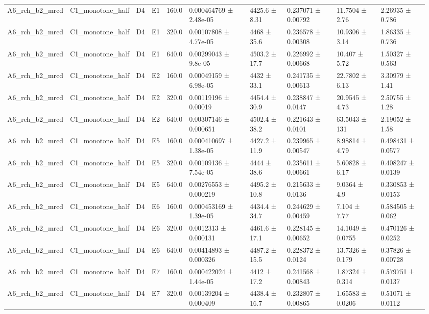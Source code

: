 \begin{table}
\begin{tabular}{llllllllll}
A6\_rch\_b2\_mrcd & C1\_monotone\_half & D4 & E1 & 160.0 & 0.000464769 ± 2.48e-05 & 4425.6 ± 8.31 & 0.237071 ± 0.00792 & 11.7504 ± 2.76 & 2.26935 ± 0.786 \\
A6\_rch\_b2\_mrcd & C1\_monotone\_half & D4 & E1 & 320.0 & 0.00107808 ± 4.77e-05 & 4468 ± 35.6 & 0.236578 ± 0.00308 & 10.9306 ± 3.14 & 1.86335 ± 0.736 \\
A6\_rch\_b2\_mrcd & C1\_monotone\_half & D4 & E1 & 640.0 & 0.00299043 ± 9.8e-05 & 4503.2 ± 17.7 & 0.226992 ± 0.00668 & 10.407 ± 5.72 & 1.50327 ± 0.563 \\
A6\_rch\_b2\_mrcd & C1\_monotone\_half & D4 & E2 & 160.0 & 0.00049159 ± 6.98e-05 & 4432 ± 33.1 & 0.241735 ± 0.00613 & 22.7802 ± 6.13 & 3.30979 ± 1.41 \\
A6\_rch\_b2\_mrcd & C1\_monotone\_half & D4 & E2 & 320.0 & 0.00119196 ± 0.00019 & 4454.4 ± 30.9 & 0.238847 ± 0.0147 & 20.9545 ± 4.73 & 2.50755 ± 1.28 \\
A6\_rch\_b2\_mrcd & C1\_monotone\_half & D4 & E2 & 640.0 & 0.00307146 ± 0.000651 & 4502.4 ± 38.2 & 0.221643 ± 0.0101 & 63.5043 ± 131 & 2.19052 ± 1.58 \\
A6\_rch\_b2\_mrcd & C1\_monotone\_half & D4 & E5 & 160.0 & 0.000410697 ± 1.38e-05 & 4427.2 ± 11.9 & 0.239965 ± 0.00547 & 8.98814 ± 4.79 & 0.498431 ± 0.0577 \\
A6\_rch\_b2\_mrcd & C1\_monotone\_half & D4 & E5 & 320.0 & 0.00109136 ± 7.54e-05 & 4444 ± 38.6 & 0.235611 ± 0.00661 & 5.60828 ± 6.17 & 0.408247 ± 0.0139 \\
A6\_rch\_b2\_mrcd & C1\_monotone\_half & D4 & E5 & 640.0 & 0.00276553 ± 0.000219 & 4495.2 ± 10.8 & 0.215633 ± 0.0136 & 9.0364 ± 4.9 & 0.330853 ± 0.0153 \\
A6\_rch\_b2\_mrcd & C1\_monotone\_half & D4 & E6 & 160.0 & 0.000453169 ± 1.39e-05 & 4434.4 ± 34.7 & 0.244629 ± 0.00459 & 7.104 ± 7.77 & 0.584505 ± 0.062 \\
A6\_rch\_b2\_mrcd & C1\_monotone\_half & D4 & E6 & 320.0 & 0.0012313 ± 0.000131 & 4461.6 ± 17.1 & 0.228145 ± 0.00652 & 14.1049 ± 0.0755 & 0.470126 ± 0.0252 \\
A6\_rch\_b2\_mrcd & C1\_monotone\_half & D4 & E6 & 640.0 & 0.00414893 ± 0.000326 & 4487.2 ± 15.5 & 0.228372 ± 0.0124 & 13.7326 ± 0.179 & 0.37826 ± 0.00728 \\
A6\_rch\_b2\_mrcd & C1\_monotone\_half & D4 & E7 & 160.0 & 0.000422024 ± 1.44e-05 & 4412 ± 17.2 & 0.241568 ± 0.00843 & 1.87324 ± 0.314 & 0.579751 ± 0.0137 \\
A6\_rch\_b2\_mrcd & C1\_monotone\_half & D4 & E7 & 320.0 & 0.00139204 ± 0.000409 & 4438.4 ± 16.7 & 0.232807 ± 0.00865 & 1.65583 ± 0.0206 & 0.51071 ± 0.0112 \\

\end{tabular}
\end{table}
